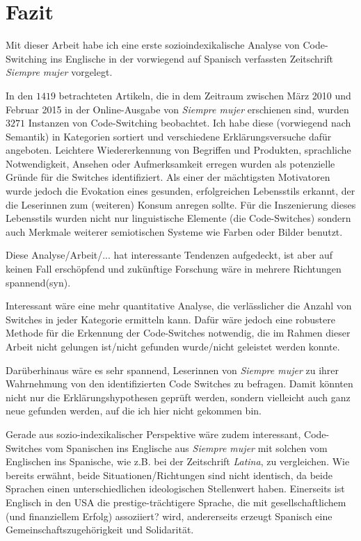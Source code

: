 \section{Fazit}
\label{chap:conclusion}

Mit dieser Arbeit habe ich eine erste sozioindexikalische Analyse von Code-Switching ins Englische in der vorwiegend auf Spanisch verfassten Zeitschrift \textit{Siempre mujer} vorgelegt.

In den $1419$ betrachteten Artikeln, die in dem Zeitraum zwischen März 2010 und Februar 2015 in der Online-Ausgabe von \textit{Siempre mujer} erschienen sind, wurden $3271$ Instanzen von Code-Switching beobachtet.
Ich habe diese (vorwiegend nach Semantik) in Kategorien sortiert und verschiedene Erklärungsversuche dafür angeboten.
Leichtere Wiedererkennung von Begriffen und Produkten, sprachliche Notwendigkeit, Ansehen oder Aufmerksamkeit erregen wurden als potenzielle Gründe für die Switches identifiziert.
Als einer der mächtigsten Motivatoren wurde jedoch die Evokation eines gesunden, erfolgreichen Lebensstils erkannt, der die Leserinnen zum (weiteren) Konsum anregen sollte.
Für die Inszenierung dieses Lebensstils wurden nicht nur linguistische Elemente (die Code-Switches) sondern auch Merkmale weiterer semiotischen Systeme wie Farben oder Bilder benutzt.

Diese Analyse/Arbeit/... hat interessante Tendenzen aufgedeckt, ist aber auf keinen Fall erschöpfend und zukünftige Forschung wäre in mehrere Richtungen spannend(syn).

Interessant wäre eine mehr quantitative Analyse, die verlässlicher die Anzahl von Switches in jeder Kategorie ermitteln kann.
Dafür wäre jedoch eine robustere Methode für die Erkennung der Code-Switches notwendig, die im Rahmen dieser Arbeit nicht gelungen ist/nicht gefunden wurde/nicht geleistet werden konnte.

Darüberhinaus wäre es sehr spannend, Leserinnen von \textit{Siempre mujer} zu ihrer Wahrnehmung von den identifizierten Code Switches zu befragen.
Damit könnten nicht nur die Erklärungshypothesen geprüft werden, sondern vielleicht auch ganz neue gefunden werden, auf die ich hier nicht gekommen bin.

Gerade aus sozio-indexikalischer Perspektive wäre zudem interessant, Code-Switches vom Spanischen ins Englische aus \textit{Siempre mujer} mit solchen vom Englischen ins Spanische, wie z.B. bei der Zeitschrift \textit{Latina}, zu vergleichen.
Wie bereits erwähnt, beide Situationen/Richtungen sind nicht identisch, da beide Sprachen einen unterschiedlichen ideologischen Stellenwert haben.
Einerseits ist Englisch in den USA die prestige-trächtigere Sprache, die mit gesellschaftlichem (und finanziellem Erfolg) assoziiert? wird,
andererseits erzeugt Spanisch eine Gemeinschaftszugehörigkeit und Solidarität.

